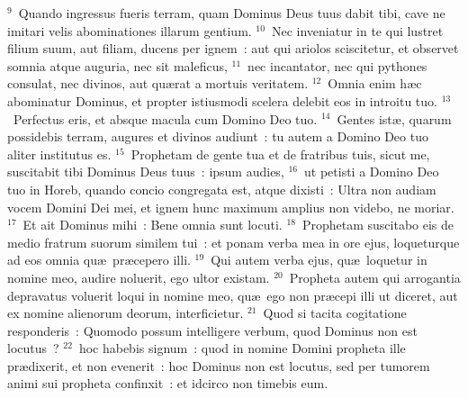 ${}^{9}$~Quando ingressus fueris terram, quam Dominus Deus tuus dabit tibi, cave ne imitari velis abominationes illarum gentium.
${}^{10}$~Nec inveniatur in te qui lustret filium suum, aut filiam, ducens per ignem~: aut qui ariolos sciscitetur, et observet somnia atque auguria, nec sit maleficus,
${}^{11}$~nec incantator, nec qui pythones consulat, nec divinos, aut qu\ae rat a mortuis veritatem.
${}^{12}$~Omnia enim h\ae c abominatur Dominus, et propter istiusmodi scelera delebit eos in introitu tuo.
${}^{13}$~Perfectus eris, et absque macula cum Domino Deo tuo.
${}^{14}$~Gentes ist\ae , quarum possidebis terram, augures et divinos audiunt~: tu autem a Domino Deo tuo aliter institutus es.
${}^{15}$~Prophetam de gente tua et de fratribus tuis, sicut me, suscitabit tibi Dominus Deus tuus~: ipsum audies,
${}^{16}$~ut petisti a Domino Deo tuo in Horeb, quando concio congregata est, atque dixisti~: Ultra non audiam vocem Domini Dei mei, et ignem hunc maximum amplius non videbo, ne moriar.
${}^{17}$~Et ait Dominus mihi~: Bene omnia sunt locuti.
${}^{18}$~Prophetam suscitabo eis de medio fratrum suorum similem tui~: et ponam verba mea in ore ejus, loqueturque ad eos omnia qu\ae\ pr\ae cepero illi.
${}^{19}$~Qui autem verba ejus, qu\ae\ loquetur in nomine meo, audire noluerit, ego ultor existam.
${}^{20}$~Propheta autem qui arrogantia depravatus voluerit loqui in nomine meo, qu\ae\ ego non pr\ae cepi illi ut diceret, aut ex nomine alienorum deorum, interficietur.
${}^{21}$~Quod si tacita cogitatione responderis~: Quomodo possum intelligere verbum, quod Dominus non est locutus~?
${}^{22}$~hoc habebis signum~: quod in nomine Domini propheta ille pr\ae dixerit, et non evenerit~: hoc Dominus non est locutus, sed per tumorem animi sui propheta confinxit~: et idcirco non timebis eum.

